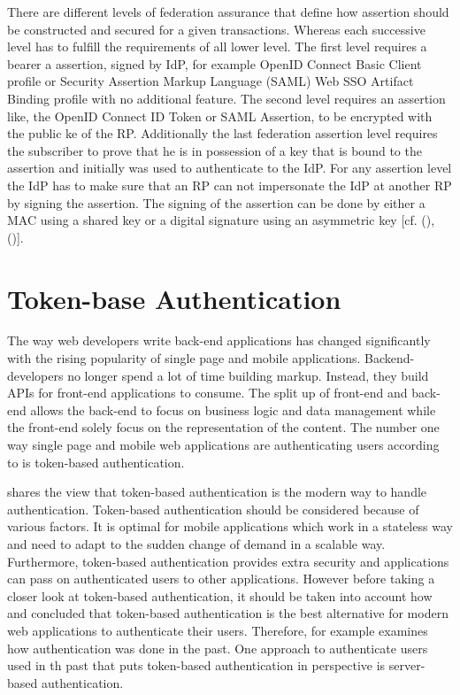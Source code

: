 There are different levels of federation assurance that define how assertion should be constructed and secured for a given transactions. Whereas each successive level has to fulfill the requirements of all lower level. The first level requires a bearer a assertion, signed by IdP, for example OpenID Connect Basic Client profile or Security Assertion Markup Language (SAML) Web SSO Artifact Binding profile with no additional feature. The second level requires an assertion like, the OpenID Connect ID Token or SAML Assertion, to be encrypted with the public ke of the RP. Additionally the last federation assertion level requires the subscriber to prove that he is in possession of a key that is bound to the assertion and initially was used to authenticate to the IdP. For any assertion level the IdP has to make sure that an RP can not impersonate the IdP at another RP by signing the assertion. The signing of the assertion can be done by either a MAC using a shared key or a digital signature using an asymmetric key [cf. (\cite{NIST:2017:DIG}), (\cite{NIST:2017:DIGFA})].  



\section{Token-base Authentication}


The way web developers write back-end applications has changed significantly with the rising popularity of single page and mobile applications. Backend-developers no longer spend a lot of time building markup. Instead, they build APIs for front-end applications to consume. The split up of front-end and back-end allows the back-end to focus on business logic and data management while the front-end solely focus on the representation of the content. The number one way single page and mobile web applications are authenticating users according to \cite{Tkalec:2015} is token-based authentication.

\cite{Serilleja:2015:Scothio} shares the view that token-based authentication is the modern way to handle authentication. Token-based authentication should be considered because of various factors. It is optimal for mobile applications which work in a stateless way and need to adapt to the sudden change of demand in a scalable way. Furthermore, token-based authentication provides extra security and applications can pass on authenticated users to other applications. However before taking a closer look at token-based authentication, it should be taken into account how \cite{Serilleja:2015:Scothio} and \cite{Tkalec:2015} concluded that token-based authentication is the best alternative for modern web applications to authenticate their users. Therefore, \cite{Serilleja:2015:Scothio} for example examines how authentication was done in the past. One approach to authenticate users used in th past that puts token-based authentication in perspective is server-based authentication. 

